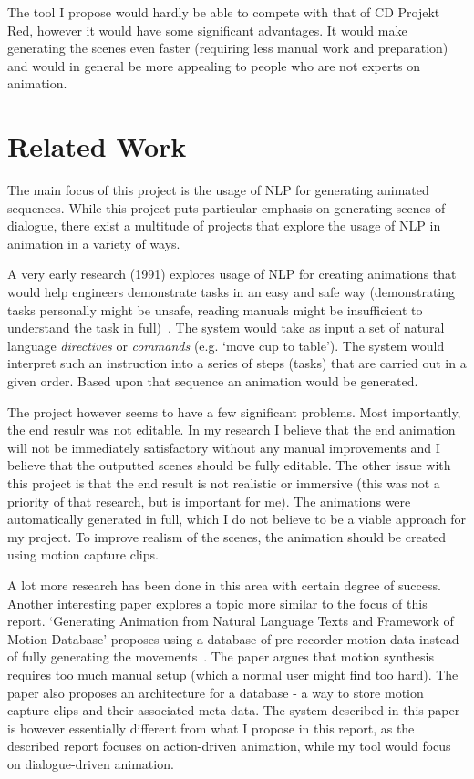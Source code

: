 The tool I propose would hardly be able to compete with that of CD Projekt Red, however it would have some significant advantages. It would make generating the scenes even faster (requiring less manual work and preparation) and would in general be more appealing to people who are not experts on animation.

\section{Related Work}
The main focus of this project is the usage of NLP for generating animated sequences. While this project puts particular emphasis on generating scenes of dialogue, there exist a multitude of projects that explore the usage of NLP in animation in a variety of ways.

A very early research (1991) explores usage of NLP for creating animations that would help engineers demonstrate tasks in an easy and safe way (demonstrating tasks personally might be unsafe, reading manuals might be insufficient to understand the task in full)~\cite{animosha}. The system would take as input a set of natural language \textit{directives} or \textit{commands} (e.g. `move cup to table'). The system would interpret such an instruction into a series of steps (tasks) that are carried out in a given order. Based upon that sequence an animation would be generated.

The project however seems to have a few significant problems. Most importantly, the end resulr was not editable. In my research I believe that the end animation will not be immediately satisfactory without any manual improvements and I believe that the outputted scenes should be fully editable. The other issue with this project is that the end result is not realistic or immersive (this was not a priority of that research, but is important for me). The animations were automatically generated in full, which I do not believe to be a viable approach for my project. To improve realism of the scenes, the animation should be created using motion capture clips.

A lot more research has been done in this area with certain degree of success. Another interesting paper explores a topic more similar to the focus of this report. `Generating Animation from Natural Language Texts and Framework of Motion Database' proposes using a database of pre-recorder motion data instead of fully generating the movements~\cite{animmc}. The paper argues that motion synthesis requires too much manual setup (which a normal user might find too hard). The paper also proposes an architecture for a database -  a way to store motion capture clips and their associated meta-data. The system described in this paper is however essentially different from what I propose in this report, as the described report focuses on action-driven animation, while my tool would focus on dialogue-driven animation.

